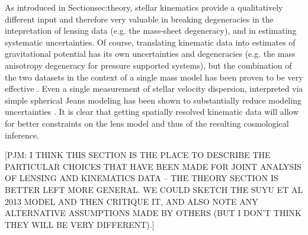 As introduced in Section{sec:theory},
stellar kinematics provide a qualitatively different input and
therefore very valuable in breaking degeneracies in the intepretation
of lensing data (e.g. the mass-sheet degeneracy), and in estimating
systematic uncertainties. Of course, translating kinematic data into
estimates of gravitational potential has its own uncertainties and
degeneracies (e.g. the mass anisotropy degeneracy for pressure
supported systems), but the combination of the two datasets
in the context of a single mass model
has been proven to be very effective
\citep{T+K04}. Even a single measurement of stellar velocity dispersion,
interpreted via
simple spherical Jeans modeling has been shown to substantially
reduce modeling uncertainties \citep{T+K02,Koo++03,Suy++14}. It is
clear that getting spatially resolved kinematic data will allow for
better constraints on the lens model and thus of the resulting
cosmological inference.

[PJM: I THINK THIS SECTION IS THE PLACE TO DESCRIBE THE PARTICULAR
CHOICES THAT HAVE BEEN MADE FOR JOINT ANALYSIS OF LENSING AND KINEMATICS
DATA --  THE THEORY SECTION IS BETTER LEFT MORE GENERAL. WE COULD SKETCH
THE SUYU ET AL 2013 MODEL AND THEN CRITIQUE IT, AND ALSO NOTE ANY
ALTERNATIVE ASSUMPTIONS MADE BY OTHERS (BUT I DON'T THINK THEY WILL BE
VERY DIFFERENT).]
